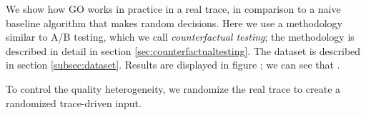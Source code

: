 We show how GO works in practice in a real trace, in comparison to a naive baseline algorithm that makes random decisions.  Here we use a methodology similar to A/B testing, which we call {\it counterfactual testing}; the methodology is described in detail in section \ref{sec:counterfactualtesting}.  The dataset is described in section \ref{subsec:dataset}.  Results are displayed in figure \fillme; we can see that \fillme.

\begin{figure}[t!]
\centering
{}
\label{fig:counterfactual}
\end{figure}

To control the quality heterogeneity, we randomize the real trace to create a randomized trace-driven input. \fillme {}




